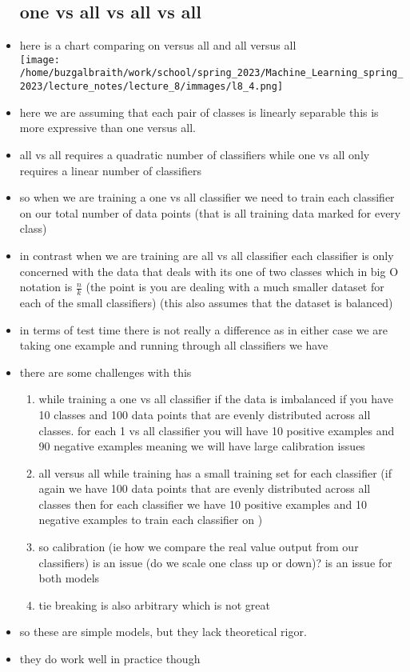 \documentclass{article}
\begin{document}
\begin{itemize}
\subsection*{one vs all vs all vs all}
\item here is a chart comparing on versus all and all versus all 
\\  \texttt{[image: /home/buzgalbraith/work/school/spring\_2023/Machine\_Learning\_spring\_2023/lecture\_notes/lecture\_8/immages/l8\_4.png]}
\item here we are assuming that each pair of classes is linearly separable this is more expressive than one versus all.
\item all vs all requires a quadratic number of classifiers while one vs all only requires a linear number of classifiers
\item so when we are training a one vs all classifier we need to train each classifier on our total number of data points (that is all training data marked for every class)
\item in contrast when we are training are all vs all classifier each classifier is only concerned with the data that deals with its one of two classes which in big O notation is $\frac{n}{k}$ (the point is you are dealing with a much smaller dataset for each of the small classifiers) (this also assumes that the dataset is balanced)
\item in terms of test time there is not really a difference as in either case we are taking one example and running through all classifiers we have 
\item there are some challenges with this 
\begin{enumerate}
    \item while training a one vs all classifier if the data is imbalanced if you have 10 classes and 100 data points that are evenly distributed across all classes. for each 1 vs all classifier you will have 10 positive examples and 90 negative examples meaning we will have large calibration issues
    \item all versus all while training has a small training set for each classifier (if again we have 100 data points that are evenly distributed across all classes then for each classifier we have 10 positive examples and 10 negative examples to train each classifier on )
    \item so calibration (ie how we compare the real value output from our classifiers) is an issue  (do we scale one class up or down)?  is an issue for both models
    \item tie breaking is also arbitrary which is not great 
\end{enumerate}
\item so these are simple models, but they lack theoretical rigor. 
\item they do work well in practice though 

\end{itemize}
\end{document}
